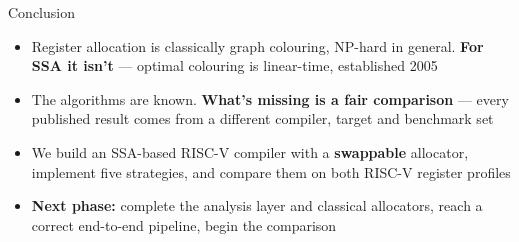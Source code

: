 \documentclass[aspectratio=169,11pt]{beamer}
\begin{document}
\begin{frame}{Conclusion}
\vspace{2mm}
\begin{itemize}\small
  \item Register allocation is classically graph colouring, NP-hard in general.
        \textbf{For SSA it isn't} --- optimal colouring is linear-time,
        established 2005
  \item The algorithms are known. \textbf{What's missing is a fair comparison}
        --- every published result comes from a different compiler, target and
        benchmark set
  \item We build an SSA-based RISC-V compiler with a \textbf{swappable}
        allocator, implement five strategies, and compare them on both RISC-V
        register profiles
  \item \textbf{Next phase:} complete the analysis layer and classical
        allocators, reach a correct end-to-end pipeline, begin the comparison
\end{itemize}
\vspace{4mm}
\end{frame}
\end{document}
